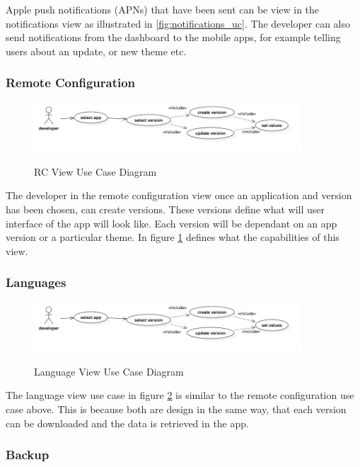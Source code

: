 Apple push notifications (APNs) that have been sent can be view in the notifications view as illustrated in \ref{fig:notifications_uc}. The developer can also send notifications from the dashboard to the mobile apps, for example telling users about an update, or new theme etc. 

\subsubsection{Remote Configuration}

\begin{figure}[!h]
    \caption{RC View Use Case Diagram}
    \centering
    \includegraphics[width=100mm]{images/use_cases/rc_uc}
    \label{fig:rc_uc}
\end{figure}
 
The developer in the remote configuration view once an application and version has been chosen, can create versions. These versions define what will user interface of the app will look like. Each version will be dependant on an app version or a particular theme. In figure \ref{fig:rc_uc} defines what the capabilities of this view.
 
\subsubsection{Languages}

\begin{figure}[!h]
    \caption{Language View Use Case Diagram}
    \centering
    \includegraphics[width=100mm]{images/use_cases/rc_uc}
    \label{fig:language_uc}
\end{figure}

The language view use case in figure \ref{fig:language_uc} is similar to the remote configuration use case above. This is because both are design in the same way, that each version can be downloaded and the data is retrieved in the app.

\subsubsection{Backup}

